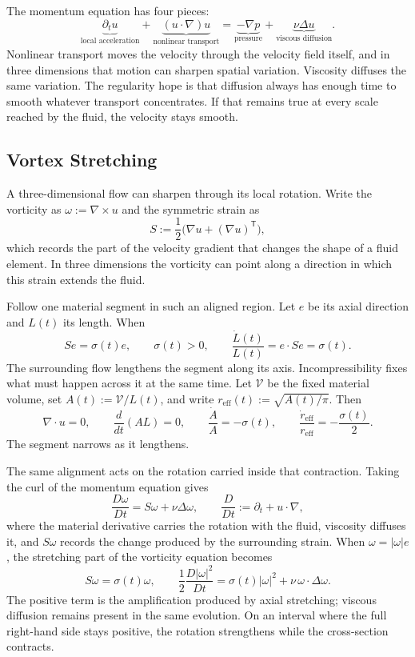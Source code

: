 
The momentum equation has four pieces:
\[
  \underbrace{\partial_t u}_{\text{local acceleration}}
  +
  \underbrace{(u\cdot\nabla)u}_{\text{nonlinear transport}}
  =
  \underbrace{-\nabla p}_{\text{pressure}}
  +
  \underbrace{\nu\Delta u}_{\text{viscous diffusion}}.
\]
Nonlinear transport moves the velocity through the velocity field itself, and in three dimensions that motion can sharpen spatial variation.
Viscosity diffuses the same variation.
The regularity hope is that diffusion always has enough time to smooth whatever transport concentrates.
If that remains true at every scale reached by the fluid, the velocity stays smooth.

\subsection{Vortex Stretching}\label{sub:ThePerfectlyStretchingVortex}

A three-dimensional flow can sharpen through its local rotation.
Write the vorticity as \(\omega:=\nabla\times u\) and the symmetric strain as
\[
  S:=\frac12\bigl(\nabla u+(\nabla u)^{\mathsf T}\bigr),
\]
which records the part of the velocity gradient that changes the shape of a fluid element.
In three dimensions the vorticity can point along a direction in which this strain extends the fluid.

Follow one material segment in such an aligned region.
Let \(e\) be its axial direction and \(L(t)\) its length.
When
\[
  Se=\sigma(t)e,
  \qquad
  \sigma(t)>0,
  \qquad
  \frac{\dot L(t)}{L(t)}
  =
  e\cdot Se
  =
  \sigma(t).
\]
The surrounding flow lengthens the segment along its axis.
Incompressibility fixes what must happen across it at the same time.
Let \(\mathcal V\) be the fixed material volume, set \(A(t):=\mathcal V/L(t)\), and write \(r_{\mathrm{eff}}(t):=\sqrt{A(t)/\pi}\).
Then
\[
  \nabla\cdot u=0,
  \qquad
  \frac{d}{dt}(A L)=0,
  \qquad
  \frac{\dot A}{A}=-\sigma(t),
  \qquad
  \frac{\dot r_{\mathrm{eff}}}{r_{\mathrm{eff}}}
  =
  -\frac{\sigma(t)}{2}.
\]
The segment narrows as it lengthens.

The same alignment acts on the rotation carried inside that contraction.
Taking the curl of the momentum equation gives
\[
  \frac{D\omega}{Dt}
  =
  S\omega+\nu\Delta\omega,
  \qquad
  \frac{D}{Dt}
  :=
  \partial_t+u\cdot\nabla,
\]
where the material derivative carries the rotation with the fluid, viscosity diffuses it, and \(S\omega\) records the change produced by the surrounding strain.
When \(\omega=|\omega|e\), the stretching part of the vorticity equation becomes
\[
  S\omega
  =
  \sigma(t)\omega,
  \qquad
  \frac12\frac{D|\omega|^2}{Dt}
  =
  \sigma(t)|\omega|^2
  +
  \nu\,\omega\cdot\Delta\omega.
\]
The positive term is the amplification produced by axial stretching; viscous diffusion remains present in the same evolution.
On an interval where the full right-hand side stays positive, the rotation strengthens while the cross-section contracts.

